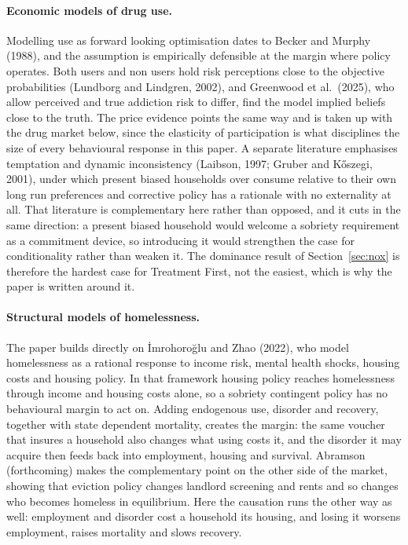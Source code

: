 \documentclass[10pt]{article}
\begin{document}
\paragraph{Economic models of drug use.} Modelling use as forward looking
optimisation dates to Becker and Murphy (1988), and the assumption is empirically
defensible at the margin where policy operates. Both users and non users hold risk
perceptions close to the objective probabilities (Lundborg and Lindgren, 2002), and
Greenwood et al.\ (2025), who allow perceived and true addiction risk to
differ, find the model implied beliefs close to the truth. The price evidence points
the same way and is taken up with the drug market below, since the elasticity of
participation is what disciplines the size of every behavioural response in this
paper. A separate literature emphasises temptation and dynamic
inconsistency (Laibson, 1997; Gruber and K\H{o}szegi, 2001), under which
present biased households over consume relative to their own long run preferences
and corrective policy has a rationale with no externality at all. That literature is
complementary here rather than opposed, and it cuts in the same direction: a
present biased household would welcome a sobriety requirement as a commitment
device, so introducing it would strengthen the case for conditionality rather than
weaken it. The dominance result of Section~\ref{sec:nox} is therefore the hardest
case for Treatment First, not the easiest, which is why the paper is written around
it.



\paragraph{Structural models of homelessness.} The paper builds directly on
\.{I}mrohoro\u{g}lu and Zhao (2022), who model homelessness as a rational
response to income risk, mental health shocks, housing costs and housing policy.
In that framework housing policy reaches homelessness through income and housing
costs alone, so a sobriety contingent policy has no behavioural margin to act on.
Adding endogenous use, disorder and recovery, together with state dependent
mortality, creates the margin: the same voucher that insures a household also
changes what using costs it, and the disorder it may acquire then feeds back into
employment, housing and survival. Abramson (forthcoming) makes the complementary
point on the other side of the market, showing that eviction policy changes landlord
screening and rents and so changes who becomes homeless in equilibrium. Here the
causation runs the other way as well: employment and disorder cost a household its
housing, and losing it worsens employment, raises mortality and slows recovery.
\end{document}
